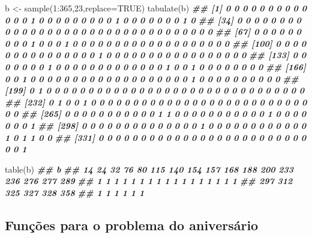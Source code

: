 \documentclass[
  11pt]{report}
\newenvironment{Shaded}{\begin{snugshade}}{\end{snugshade}}
\newcommand{\AttributeTok}[1]{\textcolor[rgb]{0.77,0.63,0.00}{#1}}
\newcommand{\ConstantTok}[1]{\textcolor[rgb]{0.00,0.00,0.00}{#1}}
\newcommand{\DecValTok}[1]{\textcolor[rgb]{0.00,0.00,0.81}{#1}}
\newcommand{\DocumentationTok}[1]{\textcolor[rgb]{0.56,0.35,0.01}{\textbf{\textit{#1}}}}
\newcommand{\FunctionTok}[1]{\textcolor[rgb]{0.00,0.00,0.00}{#1}}
\newcommand{\NormalTok}[1]{#1}
\newcommand{\OtherTok}[1]{\textcolor[rgb]{0.56,0.35,0.01}{#1}}
\newcommand{\SpecialCharTok}[1]{\textcolor[rgb]{0.00,0.00,0.00}{#1}}
\renewenvironment{Shaded}{
    \begin{mdframed}[%
      roundcorner=2pt,%
      innerleftmargin=5pt,%
      innerrightmargin=5pt,%
      topline=true,%
      leftline=true,%
      rightline=true,%
      bottomline=true,%
      linewidth=0.5pt,%
      linecolor=black!20,%
      backgroundcolor=black!2,%
      skipabove=2ex,%
      skipbelow=2.5ex%
    ]%
  }
  {
    \end{mdframed}
  }
\begin{document}
\begin{Shaded}
\begin{Highlighting}[]
\NormalTok{b }\OtherTok{\textless{}{-}} \FunctionTok{sample}\NormalTok{(}\DecValTok{1}\SpecialCharTok{:}\DecValTok{365}\NormalTok{,}\DecValTok{23}\NormalTok{,}\AttributeTok{replace=}\ConstantTok{TRUE}\NormalTok{)}
\FunctionTok{tabulate}\NormalTok{(b)}
\DocumentationTok{\#\#   [1] 0 0 0 0 0 0 0 0 0 0 0 0 0 1 0 0 0 0 0 0 0 0 0 1 0 0 0 0 0 0 0 1 0}
\DocumentationTok{\#\#  [34] 0 0 0 0 0 0 0 0 0 0 0 0 0 0 0 0 0 0 0 0 0 0 0 0 0 0 0 0 0 0 0 0 0}
\DocumentationTok{\#\#  [67] 0 0 0 0 0 0 0 0 0 1 0 0 0 1 0 0 0 0 0 0 0 0 0 0 0 0 0 0 0 0 0 0 0}
\DocumentationTok{\#\# [100] 0 0 0 0 0 0 0 0 0 0 0 0 0 0 0 1 0 0 0 0 0 0 0 0 0 0 0 0 0 0 0 0 0}
\DocumentationTok{\#\# [133] 0 0 0 0 0 0 0 1 0 0 0 0 0 0 0 0 0 0 0 0 0 1 0 0 1 0 0 0 0 0 0 0 0}
\DocumentationTok{\#\# [166] 0 0 1 0 0 0 0 0 0 0 0 0 0 0 0 0 0 0 0 0 0 0 1 0 0 0 0 0 0 0 0 0 0}
\DocumentationTok{\#\# [199] 0 1 0 0 0 0 0 0 0 0 0 0 0 0 0 0 0 0 0 0 0 0 0 0 0 0 0 0 0 0 0 0 0}
\DocumentationTok{\#\# [232] 0 1 0 0 1 0 0 0 0 0 0 0 0 0 0 0 0 0 0 0 0 0 0 0 0 0 0 0 0 0 0 0 0}
\DocumentationTok{\#\# [265] 0 0 0 0 0 0 0 0 0 0 0 1 1 0 0 0 0 0 0 0 0 0 0 0 1 0 0 0 0 0 0 0 1}
\DocumentationTok{\#\# [298] 0 0 0 0 0 0 0 0 0 0 0 0 0 0 1 0 0 0 0 0 0 0 0 0 0 0 0 1 0 1 1 0 0}
\DocumentationTok{\#\# [331] 0 0 0 0 0 0 0 0 0 0 0 0 0 0 0 0 0 0 0 0 0 0 0 0 0 0 0 1}
\end{Highlighting}
\end{Shaded}

\begin{Shaded}
\begin{Highlighting}[]
\FunctionTok{table}\NormalTok{(b)}
\DocumentationTok{\#\# b}
\DocumentationTok{\#\#  14  24  32  76  80 115 140 154 157 168 188 200 233 236 276 277 289 }
\DocumentationTok{\#\#   1   1   1   1   1   1   1   1   1   1   1   1   1   1   1   1   1 }
\DocumentationTok{\#\# 297 312 325 327 328 358 }
\DocumentationTok{\#\#   1   1   1   1   1   1}
\end{Highlighting}
\end{Shaded}

\hypertarget{funuxe7uxf5es-para-o-problema-do-aniversuxe1rio}{%
\subsection*{Funções para o problema do aniversário}\label{funuxe7uxf5es-para-o-problema-do-aniversuxe1rio}}
\end{document}
